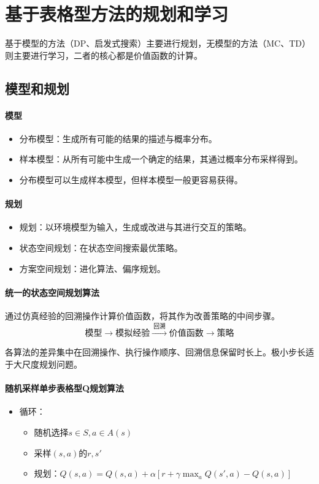 \documentclass[
12pt, %
a4paper, 
oneside, %
headinclude,footinclude, %
]{scrartcl}
\begin{document}
\section{基于表格型方法的规划和学习}
基于模型的方法（DP、启发式搜索）主要进行规划，无模型的方法（MC、TD）则主要进行学习，二者的核心都是价值函数的计算。
\subsection{模型和规划}
\paragraph{模型}
\begin{itemize}
\item 分布模型：生成所有可能的结果的描述与概率分布。
\item 样本模型：从所有可能中生成一个确定的结果，其通过概率分布采样得到。
\item 分布模型可以生成样本模型，但样本模型一般更容易获得。
\end{itemize}
\paragraph{规划}
\begin{itemize}
\item 规划：以环境模型为输入，生成或改进与其进行交互的策略。
\item 状态空间规划：在状态空间搜索最优策略。
\item 方案空间规划：进化算法、偏序规划。
\end{itemize}
\paragraph{统一的状态空间规划算法}
通过仿真经验的回溯操作计算价值函数，将其作为改善策略的中间步骤。
$$ \text{模型} \xrightarrow{\quad} \text{模拟经验} \xrightarrow{\ \text{回溯}\ } \text{价值函数} \xrightarrow{\quad} \text{策略} $$

各算法的差异集中在回溯操作、执行操作顺序、回溯信息保留时长上。极小步长适于大尺度规划问题。
\paragraph{随机采样单步表格型Q规划算法}
\begin{itemize}
\item 循环：
\begin{itemize}
\item 随机选择$ s \in S, a \in A(s) $
\item 采样$ (s, a) $的$ r,s' $
\item 规划：$ Q(s, a) = Q(s, a) + \alpha[r + \gamma \max_aQ(s', a) - Q(s, a)] $
\end{itemize}
\end{itemize}
\end{document}
